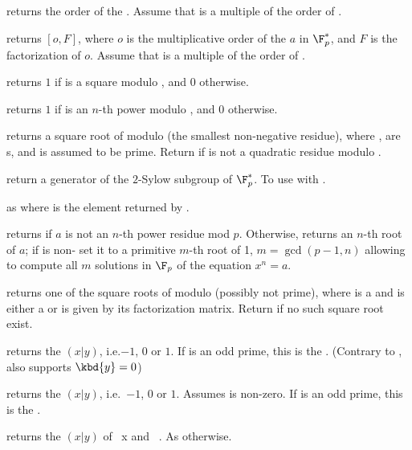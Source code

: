  returns the order of the
 . Assume that  is a multiple of the order of
.

 returns $[o,F]$, where $o$
is the multiplicative order of the  $a$ in $\F_p^*$, and $F$ is the
factorization of $o$. Assume that  is a multiple of the order of
.

 returns $1$ if  is a square
modulo , and $0$ otherwise.

 returns $1$ if  is an
$n$-th power modulo , and $0$ otherwise.

 returns a square root of  modulo
 (the smallest non-negative residue), where ,  are
s, and  is assumed to be prime. Return 
if  is not a quadratic residue modulo .

 return a generator of
the $2$-Sylow subgroup of $\F_p^*$. To use with .

as  where  is the element returned by
.

returns  if $a$ is not an $n$-th power residue mod $p$.
Otherwise, returns an $n$-th root of $a$; if  is non-
set it to a primitive $m$-th root of 1, $m = \gcd(p-1,n)$ allowing to compute
all $m$ solutions in $\F_p$ of the equation $x^n = a$.

 returns one of the square roots of 
modulo  (possibly not prime), where  is a  and 
is either a  or is given by its factorization matrix.  Return
 if no such square root exist.

 returns the  $(x|y)$,
i.e.$-1$, $0$ or $1$. If  is an odd prime, this is the . (Contrary to ,  also supports $\kbd{y} = 0$)

 returns the 
$(x|y)$, i.e.~$-1$, $0$ or $1$. Assumes  is non-zero. If  is an
odd prime, this is the .

 returns the  $(x|y)$
of ~x and ~. As  otherwise.

